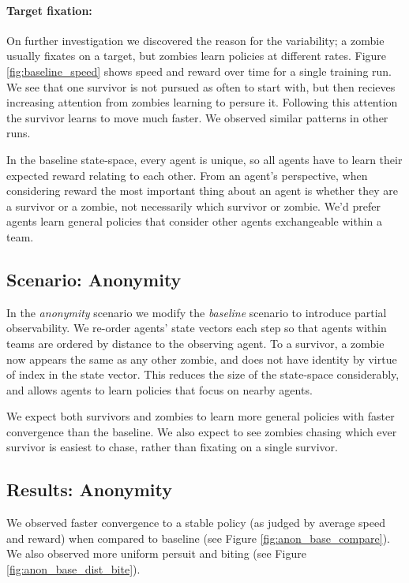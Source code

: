 \documentclass[11pt,a4paper]{article}
\begin{document}
\paragraph{Target fixation:} On further investigation we discovered the reason for the variability; a zombie usually fixates on a target, but zombies learn policies at different rates.
Figure \ref{fig:baseline_speed} shows speed and reward over time for a single training run.
We see that one survivor is not pursued as often to start with, but then recieves increasing attention from zombies learning to persure it.
Following this attention the survivor learns to move much faster.
We observed similar patterns in other runs.

In the baseline state-space, every agent is unique, so all agents have to learn their expected reward relating to each other.
From an agent's perspective, when considering reward the most important thing about an agent is whether they are a survivor or a zombie, not necessarily which survivor or zombie.
We'd prefer agents learn general policies that consider other agents exchangeable within a team.

\subsection{Scenario: Anonymity}
\label{sec:anon}

In the \emph{anonymity} scenario we modify the \emph{baseline} scenario to introduce partial observability.
We re-order agents' state vectors each step so that agents within teams are ordered by distance to the observing agent.
To a survivor, a zombie now appears the same as any other zombie, and does not have identity by virtue of index in the state vector.
This reduces the size of the state-space considerably, and allows agents to learn policies that focus on nearby agents.

We expect both survivors and zombies to learn more general policies with faster convergence than the baseline.
We also expect to see zombies chasing which ever survivor is easiest to chase, rather than fixating on a single survivor.

\subsection{Results: Anonymity}

We observed faster convergence to a stable policy (as judged by average speed and reward) when compared to baseline (see Figure \ref{fig:anon_base_compare}).
We also observed more uniform persuit and biting (see Figure \ref{fig:anon_base_dist_bite}).
\end{document}
